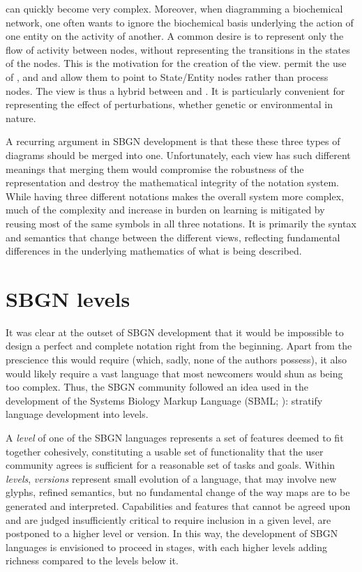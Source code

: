 \PDs{} can quickly become very complex.  Moreover, when diagramming a biochemical network, one often wants to ignore the biochemical basis underlying the action of one entity on the activity of another.  A common desire is to represent only the flow of activity between nodes, without representing the transitions in the states of the nodes.  This is the motivation for the creation of the \AF view.  \AFs permit the use of ,  and  and allow them to point to State/Entity nodes rather than process nodes.  The \AF view is thus a hybrid between \PD and \ERs.  It is particularly convenient for representing the effect of perturbations, whether genetic or environmental in nature.

A recurring argument in SBGN development is that these these three types of diagrams should be merged into one.  Unfortunately, each view has such different meanings that merging them would compromise the robustness of the representation and destroy the mathematical integrity of the notation system.  While having three different notations makes the overall system more complex, much of the complexity and increase in burden on learning is mitigated by reusing most of the same symbols in all three notations.  It is primarily the syntax and semantics that change between the different views, reflecting fundamental differences in the underlying mathematics of what is being described.

\section{SBGN levels}
\label{sec:sbgn-levels}

It was clear at the outset of SBGN development that it would be impossible to design a perfect and complete notation right from the beginning.  Apart from the prescience this would require (which, sadly, none of the authors possess), it also would likely require a vast language that most newcomers would shun as being too complex.  Thus, the SBGN community followed an idea used in the development of the Systems Biology Markup Language (SBML; \cite{Hucka:2003}): stratify language development into levels.

A \emph{level} of one of the SBGN languages represents a set of features deemed to fit together cohesively, constituting a usable set of functionality that the user community agrees is sufficient for a reasonable set of tasks and goals.  Within \emph{levels}, \emph{versions} represent small evolution of a language, that may involve new glyphs, refined semantics, but no fundamental change of the way maps are to be generated and interpreted. Capabilities and features that cannot be agreed upon and are judged insufficiently critical to require inclusion in a given level, are postponed to a higher level or version.  In this way, the development of SBGN languages is envisioned to proceed in stages, with each higher levels adding richness compared to the levels below it.

